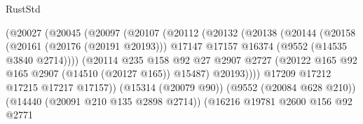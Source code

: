 \begin{lexlean}{RustStd}
\begin{coremodule}
                                        (@20027
                                          (@20045
                                            (@20097
                                              (@20107
                                                (@20112
                                                  (@20132
                                                    (@20138
                                                      (@20144
                                                        (@20158
                                                          (@20161 (@20176 (@20191 @20193)))
                                                          @17147
                                                          @17157
                                                          @16374
                                                          (@9552 (@14535 @3840 @2714))))
                                                      (@20114
                                                        @235
                                                        @158
                                                        @92
                                                        @27
                                                        @2907
                                                        @2727
                                                        (@20122
                                                          @165
                                                          @92
                                                          @165
                                                          @2907
                                                          (@14510 (@20127 @165))
                                                          @15487)
                                                        @20193))))
                                                @17209
                                                @17212
                                                @17215
                                                @17217
                                                @17157))
                                            (@15314 (@20079 @90))
                                            (@9552 (@20084 @628 @210))
                                            (@14440 (@20091 @210 @135 @2898 @2714))
                                            (@16216
                                              @19781
                                              @2600
                                              @156
                                              @92
                                              @2771

\end{coremodule}
\end{lexlean}
